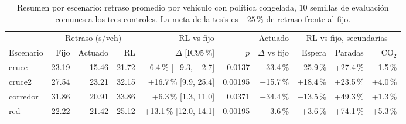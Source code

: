 \begin{table}[H]
\centering
\scriptsize
\setlength{\tabcolsep}{3pt}
\begin{tabular}{lrrrrrrrrr}
\toprule
 & \multicolumn{3}{c}{Retraso (s/veh)} & \multicolumn{2}{c}{RL vs fijo} & Actuado & \multicolumn{3}{c}{RL vs fijo, secundarias} \\
\cmidrule(lr){2-4}\cmidrule(lr){5-6}\cmidrule(lr){7-7}\cmidrule(lr){8-10}
Escenario & Fijo & Actuado & RL & $\Delta$ [IC95\,\%] & $p$ & $\Delta$ vs fijo & Espera & Paradas & CO$_2$ \\
\midrule
cruce & 23.19 & 15.46 & 21.72 & $-$6.4\,\% [$-$9.3, $-$2.7] & 0.0137 & $-$33.4\,\% & $-$25.9\,\% & +27.4\,\% & $-$1.5\,\% \\
cruce2 & 27.54 & 23.21 & 32.15 & +16.7\,\% [9.9, 25.4] & 0.00195 & $-$15.7\,\% & +18.4\,\% & +23.5\,\% & +4.0\,\% \\
corredor & 31.86 & 20.91 & 33.86 & +6.3\,\% [1.3, 11.0] & 0.0371 & $-$34.4\,\% & $-$13.5\,\% & +49.3\,\% & +1.3\,\% \\
red & 22.22 & 21.42 & 25.12 & +13.1\,\% [12.0, 14.1] & 0.00195 & $-$3.6\,\% & +3.6\,\% & +74.1\,\% & +5.3\,\% \\
\bottomrule
\end{tabular}
\caption[Resumen por escenario]{Resumen por escenario: retraso promedio por vehículo con política congelada, 10 semillas de evaluación comunes a los tres controles. La meta de la tesis es $-25\,\%$ de retraso frente al fijo.}
\label{tab:resumen-escenarios}
\end{table}
